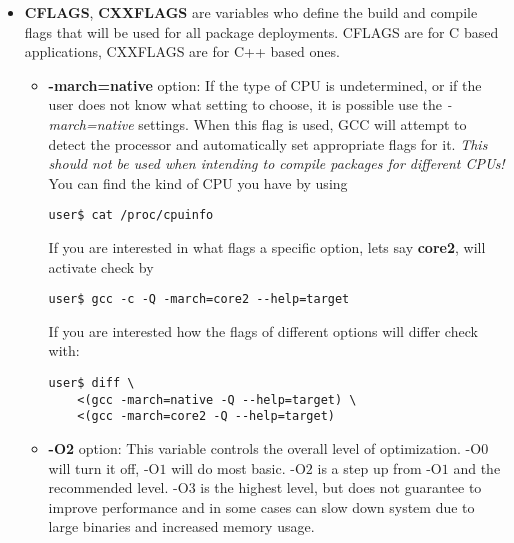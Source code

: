 \documentclass[11pt,a4paper]{article}
\begin{document}
                \begin{itemize}
                    \item \textbf{CFLAGS}, \textbf{CXXFLAGS} are variables who define the build and compile flags that will be used for all package deployments. CFLAGS are for C based applications, CXXFLAGS are for C++ based ones.

                        

                        \begin{itemize}[label={o}]

                            \item \textbf{-march=native} option: If the type of CPU is undetermined, or if the user does not know what setting to choose, it is possible use the \textit{-march=native} settings. When this flag is used, GCC will attempt to detect the processor and automatically set appropriate flags for it. \textit{This should not be used when intending to compile packages for different CPUs!}\\ You can find the kind of CPU you have by using

                                \begin{lstlisting}[style=BashInputUser]
user$ cat /proc/cpuinfo
                                \end{lstlisting}

                                If you are interested in what flags a specific option, lets say \textbf{core2}, will activate check by

                                \begin{lstlisting}[style=BashInputUser]
user$ gcc -c -Q -march=core2 --help=target
                                \end{lstlisting}

                                If you are interested how the flags of different options will differ check with:

                                \begin{lstlisting}[style=BashInputUser]
user$ diff \
    <(gcc -march=native -Q --help=target) \
    <(gcc -march=core2 -Q --help=target)
                                \end{lstlisting}

                            \item \textbf{-O2} option: This variable controls the overall level of optimization. $ \mbox{-O}0 $ will turn it off, $ \mbox{-O}1 $ will do most basic. $ \mbox{-O}2 $ is a step up from $ \mbox{-O}1 $ and the recommended level. $ \mbox{-O}3 $ is the highest level, but does not guarantee to improve performance and in some cases can slow down system due to large binaries and increased memory usage.


\end{itemize}
\end{itemize}
\end{document}
